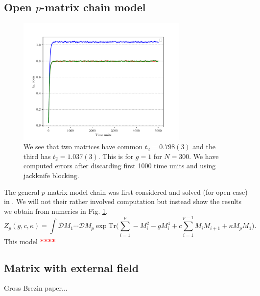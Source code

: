 \documentclass[11pt]{article}
\newcommand{\TODO}[1]{\textcolor{red}{{\bf #1}}}
\begin{document}

\subsection{Open $p$-matrix chain model}

\begin{figure}[htbp] 
	\centering 
	\includegraphics[width=0.75\textwidth]{figs/3MM_open.pdf}
	\caption{\label{fig:3MM_open}We see that two matrices have common $t_{2} = 0.798(3)$ and the third has 
	$t_{2} = 1.037(3)$. This is for $g=1$ for $N=300$. We have computed errors after discarding first 1000 time units and 
	using jackknife blocking.}
\end{figure}

The general $p$-matrix model chain was first considered and solved (for open case) in \cite{Chadha:1980ri}. We will not
their rather involved computation but instead show the results we obtain from numerics in Fig. \ref{fig:3MM_open}.  
\begin{equation}
\label{eq:Mehta1} 
Z_{p}(g,c,\kappa) = \int \mathcal{D}M_{1} \cdots  \mathcal{D}M_{p} \exp \mathrm{Tr}\Bigg(\sum_{i=1}^{p} -M_{i}^2  - g M_{i}^{4} + c \sum_{i=1}^{p-1} M_{i}M_{i+1} 
+ \kappa M_{p}M_{1} \Bigg).
\end{equation}
This model \TODO{*****} 


\subsection{Matrix with external field} 


Gross Brezin paper...
\end{document}
